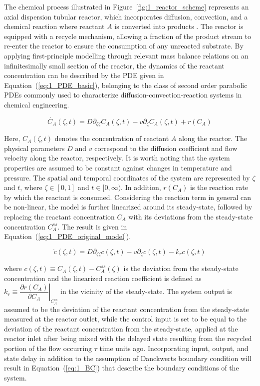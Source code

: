 The chemical process illustrated in Figure~\ref{fig:1_reactor_scheme} represents an axial dispersion tubular reactor, which incorporates diffusion, convection, and a chemical reaction where reactant $A$ is converted into products \autocite{levenspiel1998chemical}. The reactor is equipped with a recycle mechanism, allowing a fraction of the product stream to re-enter the reactor to ensure the consumption of any unreacted substrate. By applying first-principle modelling through relevant mass balance relations on an infinitesimally small section of the reactor, the dynamics of the reactant concentration can be described by the PDE given in Equation~(\ref{eq:1_PDE_basic}), belonging to the class of second order parabolic PDEs commonly used to characterize diffusion-convection-reaction systems \autocite{jensen1982bifurcation} in chemical engineering.

\begin{equation} \label{eq:1_PDE_basic}
    \dot{C_A}(\zeta, t) = D \partial_{\zeta \zeta} C_A(\zeta, t) - v \partial_\zeta C_A(\zeta, t) + r(C_A)
\end{equation}

Here, $C_A(\zeta, t)$ denotes the concentration of reactant $A$ along the reactor. The physical parameters $D$ and $v$ correspond to the diffusion coefficient and flow velocity along the reactor, respectively. It is worth noting that the system properties are assumed to be constant against changes in temperature and pressure. The spatial and temporal coordinates of the system are represented by $\zeta$ and $t$, where $\zeta \in [0, 1]$ and $t \in [0, \infty)$. In addition, $r(C_A)$ is the reaction rate by which the reactant is consumed. Considering the reaction term in general can be non-linear, the model is further linearized around its steady-state, followed by replacing the reactant concentration $C_A$ with its deviations from the steady-state concentration $C_{A}^{ss}$. The result is given in Equation~(\ref{eq:1_PDE_original_model}).

\begin{equation} \label{eq:1_PDE_original_model}
    \dot{c}(\zeta, t) = D \partial_{\zeta \zeta} c(\zeta, t) - v \partial_\zeta c(\zeta, t) - k_r c(\zeta, t)
\end{equation}

where $c(\zeta, t) \equiv C_A(\zeta, t) - C_{A}^{ss}(\zeta)$ is the deviation from the steady-state concentration and the linearized reaction coefficient is defined as $k_r \equiv \left. \dfrac{\partial r(C_A)}{\partial C_A} \right|_{C_{A}^{ss}}$ in the vicinity of the steady-state. The system output is assumed to be the deviation of the reactant concentration from the steady-state measured at the reactor outlet, while the control input is set to be equal to the deviation of the reactant concentration from the steady-state, applied at the reactor inlet after being mixed with the delayed state resulting from the recycled portion of the flow occurring $\tau$ time units ago. Incorporating input, output, and state delay in addition to the assumption of Danckwerts boundary condition will result in Equation~(\ref{eq:1_BC}) that describe the boundary conditions of the system.

